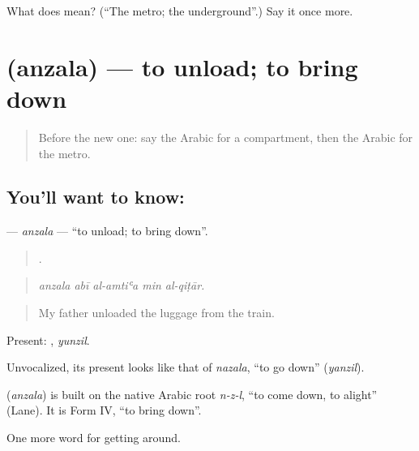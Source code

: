 \begin{tcolorbox}[breakable,colback=teal!4,colframe=teal!35!black,title={Before you move on}]
What does  mean? (\textquotedblleft{}The metro; the underground\textquotedblright{}.) Say it once more.
\end{tcolorbox}
\section[\texorpdfstring{\ar{أنزل} (anzala)}{أنزل (anzala)}]{ (anzala) — to unload; to bring down}

\label{lesson:AR-C428-anzala}



\begin{quote}
Before the new one: say the Arabic for a compartment, then the Arabic for the metro.
\end{quote}

\subsection*{You'll want to know: }
\textbf{} — \emph{anzala} — \textquotedblleft{}to unload; to bring down\textquotedblright{}.

\begin{quote}
    .
\end{quote}

\begin{quote}
\emph{anzala abī al-amtiʿa min al-qiṭār.}
\end{quote}

\begin{quote}
My father unloaded the luggage from the train.
\end{quote}

Present: , \emph{yunzil}.

Unvocalized, its present  looks like that of \emph{nazala}, \textquotedblleft{}to go down\textquotedblright{} (\emph{yanzil}).

\begin{cousinweb}
\textbf{} (\emph{anzala}) is built on the native Arabic root \emph{n-z-l}, \textquotedblleft{}to come down, to alight\textquotedblright{} (Lane). It is Form IV, \textquotedblleft{}to bring down\textquotedblright{}.
\end{cousinweb}

\begin{grammarlens}[title={What you've built}]
One more word for getting around.
\end{grammarlens}

